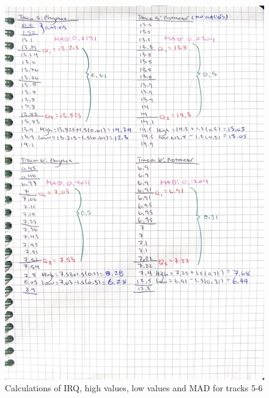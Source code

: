 \documentclass[idxtotoc,hyperref,openany]{labbook} %
\begin{document}
\begin{figure}[H] %
\begin{center}
\includegraphics[width=0.9\linewidth]{images/PhyProTrack5-6.png}
\end{center}
\caption{Calculations of IRQ, high values, low values and MAD for tracks 5-6}
\label{fig:Track5-6PhyphoxProtractor}
\end{figure}
\end{document}
